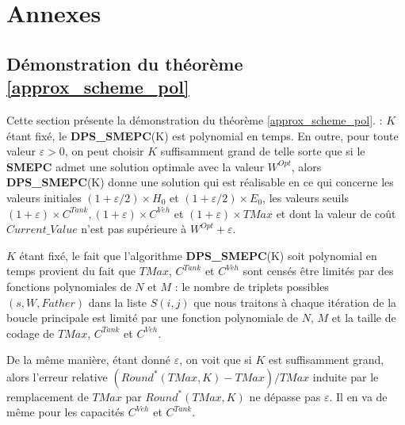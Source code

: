 \section{Annexes}

\subsection{Démonstration du théorème \ref{approx_scheme_pol}}
\label{approx_scheme_pol_section}
Cette section présente la démonstration du théorème \ref{approx_scheme_pol}. :
	$K$ étant fixé, le \textbf{DPS\_SMEPC}(K) est polynomial en temps. En outre, pour toute valeur $\varepsilon > 0$, on peut choisir $K$ suffisamment grand de telle sorte que si le \textbf{SMEPC} admet une solution optimale avec la valeur $W^{Opt}$, alors \textbf{DPS\_SMEPC}(K) donne une solution qui est réalisable en ce qui concerne les valeurs initiales $(1 + \varepsilon/ 2)\times H_0$ et $(1 + \varepsilon/ 2)\times E_0$, les valeurs seuils $(1 +\varepsilon )\times C^{Tank}, (1 + \varepsilon)\times C^{Veh}$ et $(1 + \varepsilon)\times TMax$ et dont la valeur de coût $Current\_Value$ n'est pas supérieure à $W^{Opt}+ \varepsilon$.

$K$ étant fixé, le fait que l'algorithme \textbf{DPS\_SMEPC}(K) soit polynomial en temps provient du fait que $TMax$, $C^{Tank}$ et $C^{Veh}$ sont censés être limités par des fonctions polynomiales de $N$ et $M$ : le nombre de triplets possibles $(s, W, Father)$ dans la liste $S(i, j)$ que nous traitons à chaque itération de la boucle principale est limité par une fonction polynomiale de $N$, $M$ et la taille de codage de $TMax$, $C^{Tank}$ et $C^{Veh}$. 

De la même manière, étant donné $\varepsilon$, on voit que si $K$ est suffisamment grand, alors l'erreur relative $(Round^*(TMax, K) - TMax) / TMax$ induite par le remplacement de $TMax$ par $Round^*(TMax, K)$ ne dépasse pas $\varepsilon$. Il en va de même pour les capacités $C^{Veh}$ et $ C^{Tank}$. 

